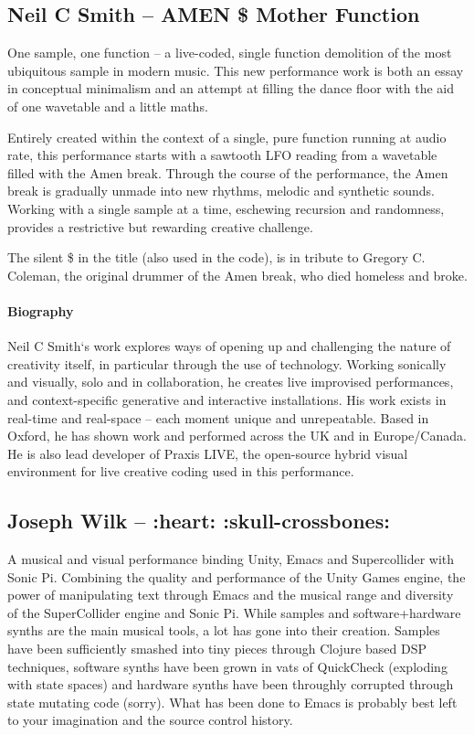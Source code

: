 \documentclass[sigplan,10pt,review]{acmart}\settopmatter{printfolios=true}
\begin{document}
\subsection{Neil C Smith -- AMEN \${} Mother Function}

One sample, one function -- a live-coded, single function demolition of
the most ubiquitous sample in modern music. This new performance work
is both an essay in conceptual minimalism and an attempt at filling
the dance floor with the aid of one wavetable and a little maths.

Entirely created within the context of a single, pure function running
at audio rate, this performance starts with a sawtooth LFO reading
from a wavetable filled with the Amen break. Through the course of the
performance, the Amen break is gradually unmade into new rhythms,
melodic and synthetic sounds. Working with a single sample at a time,
eschewing recursion and randomness, provides a restrictive but
rewarding creative challenge.

The silent \${} in the title (also used in the code), is in tribute to
Gregory C. Coleman, the original drummer of the Amen break, who died
homeless and broke.

\paragraph{Biography}

Neil C Smith‘s work explores ways of opening up and challenging the
nature of creativity itself, in particular through the use of
technology. Working sonically and visually, solo and in collaboration,
he creates live improvised performances, and context-specific
generative and interactive installations. His work exists in real-time
and real-space – each moment unique and unrepeatable. Based in Oxford,
he has shown work and performed across the UK and in Europe/Canada. He
is also lead developer of Praxis LIVE, the open-source hybrid visual
environment for live creative coding used in this
performance.


\subsection{Joseph Wilk -- :heart: :skull-crossbones:}

A musical and visual performance binding Unity, Emacs and
Supercollider with Sonic Pi. Combining the quality and performance of
the Unity Games engine, the power of manipulating text through Emacs
and the musical range and diversity of the SuperCollider engine and
Sonic Pi. While samples and software+hardware synths are the main
musical tools, a lot has gone into their creation. Samples have been
sufficiently smashed into tiny pieces through Clojure based DSP
techniques, software synths have been grown in vats of QuickCheck
(exploding with state spaces) and hardware synths have been throughly
corrupted through state mutating code (sorry). What has been done to
Emacs is probably best left to your imagination and the source control
history.
\end{document}
